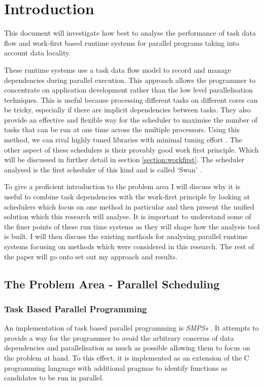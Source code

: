 \section{Introduction}
This document will investigate how best to analyse the performance of task data flow and work-first 
based runtime systems for parallel programs taking into account data locality. 

These runtime systems use a task data flow model to record and manage dependencies during parallel 
execution. This approach allows the programmer to concentrate on application development rather than 
the low level parallelisation techniques. This is useful because processing different tasks on different 
cores can be tricky, especially if there are implicit dependencies between tasks. They also provide an 
effective and flexible way for the scheduler to maximise the number of tasks that can be run at one time 
across the multiple processors. Using this method, we can rival highly tuned libraries with minimal tuning 
effort \citep{id0}. The other aspect of these schedulers is their provably good work first principle. Which 
will be discussed in further detail in section \ref{section:workfirst}. The scheduler analysed is the first 
scheduler of this kind and is called `Swan' \citep{id2}.

To give a proficient introduction to the problem area I will discuss why it is useful to combine task 
dependencies with the work-first principle by looking at schedulers which focus on one method in 
particular and then present the unified solution which this research will analyse. It is important to 
understand some of the finer points of these run time systems as they will shape how the analysis tool is 
built. I will then discuss the existing methods for analysing parallel runtime systems focusing on methods 
which were considered in this research. The rest of the paper will go onto set out my approach and 
results.

\subsection{The Problem Area - Parallel Scheduling}

\subsubsection{Task Based Parallel Programming}

An implementation of task based parallel programming is \emph{SMPSs} \citep{id0}. It attempts to 
provide a way for the programmer to avoid the arbitrary concerns of data dependencies and 
parallelisation as much as possible allowing them to focus on the problem at hand. To this effect, it is 
implemented as an extension of the C programming language with additional pragmas to identify 
functions as candidates to be run in parallel.

